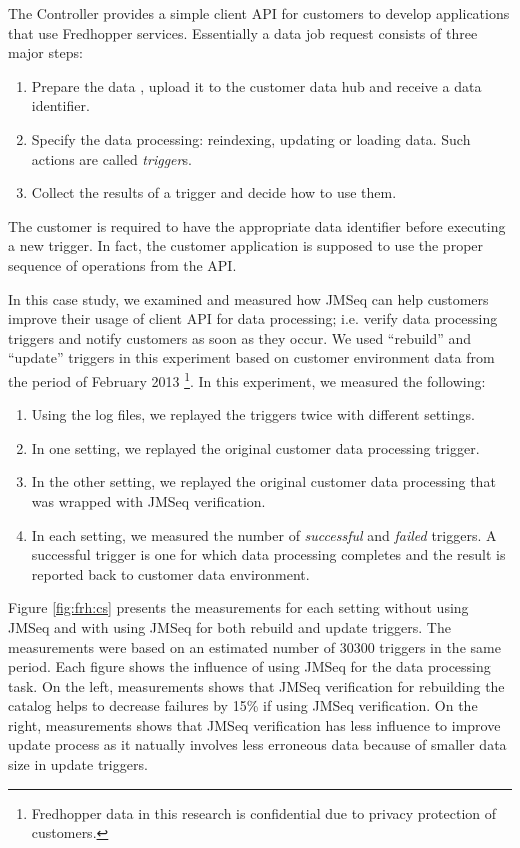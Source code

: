 The Controller provides a simple client API for customers to develop applications that use Fredhopper services.
Essentially a data job request consists of three major steps:
\begin{enumerate}
 \item Prepare the data , upload it to the customer data hub and receive a data identifier.
 \item Specify the data processing: reindexing, updating or loading data. Such actions are called \emph{trigger}s.
 \item Collect the results of a trigger and decide how to use them.
\end{enumerate}
The customer is required to have the appropriate data identifier before executing a new trigger. In fact, the customer application
is supposed to use the proper sequence of operations from the API.

In this case study, we examined and measured how JMSeq can help customers improve their usage of client API for data processing; 
i.e. verify data processing triggers and notify customers as soon as they occur.
We used ``rebuild'' and ``update'' triggers in this experiment based on customer environment data from the period of February 2013
\footnote{Fredhopper data in this research is confidential due to privacy protection of customers.}.
In this experiment, we measured the following:
\begin{enumerate}
\item Using the log files, we replayed the triggers twice with different settings.
\item In one setting, we replayed the original customer data processing trigger.
\item In the other setting, we replayed the original customer data processing that was wrapped with JMSeq verification.
\item In each setting, we measured the number of \emph{successful} and \emph{failed} triggers. 
A successful trigger is one for which data processing completes and the result is reported back to customer data environment.
\end{enumerate}

Figure \ref{fig:frh:cs} presents the measurements for each setting without using JMSeq and with using JMSeq for both rebuild and update triggers.
The measurements were based on an estimated number of 30300 triggers in the same period.
Each figure shows the influence of using JMSeq for the data processing task.
On the left, measurements shows that JMSeq verification for rebuilding the catalog helps to decrease failures by 15\% if using JMSeq verification.
On the right, measurements shows that JMSeq verification has less influence to improve update process as it natually involves less erroneous data because of smaller data size in update triggers.

